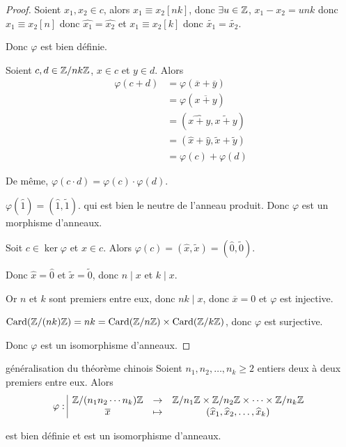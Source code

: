 \begin{proof}
    Soient $x_1, x_2 \in c$, alors $x_1 \equiv x_2 [nk]$, donc $\exists u \in \mathbb{Z}$, 
    $x_1 - x_2 = unk$ donc $x_1 \equiv x_2 [n]$ donc $\widehat{x_1} = \widehat{x_2}$ 
    et $x_1 \equiv x_2 [k]$ donc $\widetilde{x_1} = \widetilde{x_2}$.

    Donc $\varphi$ est bien définie.

    \avspace Soient $c, d \in \mathbb{Z}/nk\mathbb{Z}$, $x \in c$ et $y \in d$. Alors 
    \begin{align*}
        \varphi(c + d) & = \varphi(\overline x + \overline y) \\
        & = \varphi(\overline{x + y}) \\
        & = (\widehat{x + y}, \widetilde{x + y}) \\
        & = (\widehat x + \widehat y, \widetilde x + \widetilde y) \\
        & = \varphi(c) + \varphi(d)
    \end{align*}

    De même, $\varphi(c \cdot d) = \varphi(c) \cdot \varphi(d)$.

    $\varphi(\widehat 1) = (\widehat 1, \widetilde 1)$. qui est bien le neutre de l'anneau 
    produit. Donc $\varphi$ est un morphisme d'anneaux.

    \lvspace Soit $c \in \ker \varphi$ et $x \in c$. 
    Alors $\varphi(c) = (\widehat x, \widetilde x) = (\widehat 0, \widetilde 0)$.

    Donc $\widehat x = \widehat 0$ et $\widetilde x = \widetilde 0$, donc $n \mid x $ et $k \mid x$.

    Or $n$ et $k$ sont premiers entre eux, donc $nk \mid x$, donc $\overline x = 0$ et 
    $\varphi$ est injective.

    $\operatorname{Card}(\mathbb{Z} / (nk) \mathbb{Z}) = nk = \operatorname{Card}(\mathbb{Z} / n \mathbb{Z}) \times \operatorname{Card}(\mathbb{Z} / k \mathbb{Z})$, donc
    $\varphi$ est surjective.

    Donc $\varphi$ est un isomorphisme d'anneaux.


\end{proof}

\begin{proposition}{généralisation du théorème chinois}{}
    Soient $n_1, n_2, \ldots, n_k \geqslant 2$ entiers deux à deux premiers entre eux. 
    Alors $$\varphi: \space \begin{array}{|ccc} \displaystyle \mathbb{Z} / (n_1 n_2 \cdots n_k) \mathbb{Z} & \to & \displaystyle \mathbb{Z} / n_1 \mathbb{Z} \times \mathbb{Z} / n_2 \mathbb{Z} \times \cdots \times \mathbb{Z} / n_k \mathbb{Z} \\ \displaystyle \overline x & \mapsto & \displaystyle (\widehat x_1, \widehat x_2, \ldots, \widehat x_k) \end{array}$$

    est bien définie et est un isomorphisme d'anneaux.
\end{proposition}

